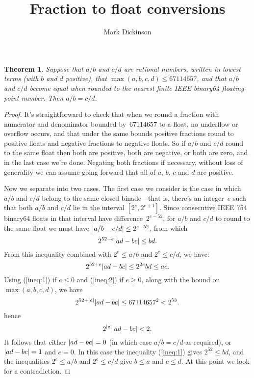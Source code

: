 \documentclass[a4paper]{article}
\title{Fraction to float conversions}
\author{Mark Dickinson}
\DeclarePairedDelimiter\abs{\lvert}{\rvert}
\theoremstyle{plain}
\newtheorem{theorem}{Theorem}
\theoremstyle{definition}
\begin{document}
\maketitle

\begin{theorem}
    Suppose that $a/b$ and $c/d$ are rational numbers, written in lowest terms
    (with $b$ and $d$ positive), that $\max(a, b, c, d) \le 67114657$, and that
    $a/b$ and $c/d$ become equal when rounded to the nearest finite IEEE
    binary64 floating-point number. Then $a/b = c/d$.
\end{theorem}

\begin{proof}
    It's straightforward to check that when we round a fraction with numerator
    and denominator bounded by~$67114657$ to a float, no underflow or overflow
    occurs, and that under the same bounds positive fractions round to positive
    floats and negative fractions to negative floats. So if $a/b$ and $c/d$
    round to the same float then both are positive, both are negative, or both
    are zero, and in the last case we're done. Negating both fractions if
    necessary, without loss of generality we can assume going forward that all
    of $a$, $b$, $c$ and $d$ are positive.

    Now we separate into two cases. The first case we consider is the case in
    which $a/b$ and $c/d$ belong to the same closed binade---that is, there's
    an integer~$e$ such that both $a/b$ and $c/d$ lie in the interval $[2^e,
    2^{e+1}]$.
    Since consecutive IEEE 754 binary64 floats in that interval have
    difference~$2^{e-52}$, for $a/b$ and $c/d$ to round to the same float we
    must have
    $\abs{a/b - c/d} \le 2^{e-52}$, from which
    \begin{equation}
        2^{52-e}\abs{ad - bc} \le bd.\label{ineq:1}
    \end{equation}
    From this inequality combined with $2^e \le a/b$ and $2^e \le c/d$, we
    have:
    \begin{equation}
        2^{52+e}\abs{ad - bc} \le 2^{2e}bd \le ac  .\label{ineq:2}
    \end{equation}
    Using (\ref{ineq:1}) if $e \le 0$ and (\ref{ineq:2}) if $e \ge 0$, along
    with the bound on~$\max(a, b, c, d)$, we have
    \begin{equation}
        2^{52 + \abs{e}}\abs{ad - bc} \le 67114657^2 < 2^{53}.\label{ineq:3}
    \end{equation}
    hence
    \begin{equation}
        2^{\abs{e}}\abs{ad - bc} < 2.\label{ineq:4}
    \end{equation}
    It follows that either $\abs{ad - bc} = 0$ (in which case $a/b = c/d$ as
    required), or $\abs{ad - bc} = 1$ and $e = 0$. In this case the inequality
    (\ref{ineq:1}) gives $2^{52} \le bd$, and the inequalities $2^e \le a/b$
    and $2^e \le c/d$ give $b \le a$ and $c \le d$. At this point we look for
    a contradiction.


\end{proof}
\end{document}
